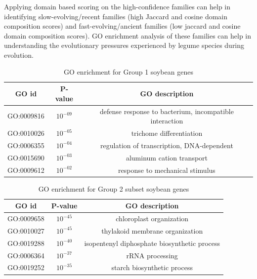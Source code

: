 \documentclass{article}
\begin{document}
		Applying domain based scoring on the high-confidence families can help in identifying slow-evolving/recent families (high Jaccard and cosine domain composition scores) and fast-evolving/ancient families (low jaccard and cosine domain composition scores). GO enrichment analysis of these families can help in understanding the evolutionary pressures experienced by legume species during evolution.
		
		\begin{table}[h!]
			\centering
			\begin{tabular}{|c |c |c |} 
				\hline
				GO id & P-value & GO description \\
				\hline\hline
				GO:0009816 & $10^{-09}$ & defense response to bacterium, incompatible interaction \\ 
				\hline
				GO:0010026 & $10^{-05}$ & trichome differentiation \\
				\hline
				GO:0006355 & $10^{-04}$ & regulation of transcription, DNA-dependent \\
				\hline
				GO:0015690 & $10^{-03}$ & aluminum cation transport \\
				\hline
				GO:0009612 & $10^{-02}$ & response to mechanical stimulus \\ 
				\hline
			\end{tabular}
			\caption{GO enrichment for Group 1 soybean genes}
			\label{tab:gotable_group1}
		\end{table}
		
		\begin{table}[h!]
			\centering
			\begin{tabular}{|c |c |c |} 
				\hline
				GO id & P-value & GO description \\
				\hline\hline
				GO:0009658 & $10^{-45}$ & chloroplast organization \\ 
				\hline
				GO:0010027 & $10^{-45}$ & thylakoid membrane organization \\
				\hline
				GO:0019288 & $10^{-40}$ & isopentenyl diphosphate biosynthetic process \\
				\hline
				GO:0006364 & $10^{-37}$ & rRNA processing \\
				\hline
				GO:0019252 & $10^{-35}$ & starch biosynthetic process \\ 
				\hline
			\end{tabular}
			\caption{GO enrichment for Group 2 subset soybean genes}
			\label{tab:gotable_group2_subset}
		\end{table}
		
\end{document}
